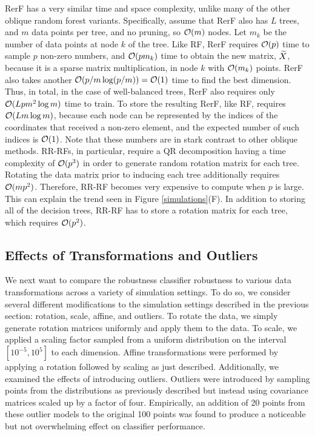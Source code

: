 \documentclass{article}
\begin{document}
RerF has a very similar time and space complexity, unlike many of the other oblique random forest variants.  Specifically, assume that RerF also has $L$ trees, and $m$ data points per tree, and no pruning, so $\mathcal{O}(m)$ nodes. Let $m_k$ be the number of data points at node $k$ of the tree. Like RF, RerF requires $\mathcal{O}(p)$ time to sample $p$ non-zero numbers, and $\mathcal{O}(pm_k)$ time to obtain the new matrix, $\widetilde{X}$, because it is a sparse matrix multiplication, in node $k$ with $\mathcal{O}(m_k)$ points. RerF also takes another $\mathcal{O}(p/m\log(p/m))=\mathcal{O}(1)$ time to find the best dimension. Thus, in total, in the case of well-balanced trees, RerF also requires only $\mathcal{O}(Lpm^2\log m)$ time to train.  To store the resulting RerF, like RF, requires $\mathcal{O}(L m\log m)$, because each node can be represented by the indices of the coordinates that received a non-zero element, and the expected number of such indices is $\mathcal{O}(1)$. Note that these numbers are in stark contrast to other oblique methods. RR-RFs, in particular, require a QR decomposition having a time complexity of $\mathcal{O}(p^3)$ in order to generate random rotation matrix for each tree. Rotating the data matrix prior to inducing each tree additionally requires $\mathcal{O}(mp^2)$. Therefore, RR-RF becomes very expensive to compute when $p$ is large. This can explain the trend seen in Figure \ref{simulations}(F). In addition to storing all of the decision trees, RR-RF has to store a rotation matrix for each tree, which requires $\mathcal{O}(p^2)$.

\subsection{Effects of Transformations and Outliers}
\label{section: trans}

We next want to compare the robustness classifier robustness to various data transformations across a variety of simulation settings. To do so, we consider several different modifications to the simulation settings described in the previous section: rotation, scale, affine, and outliers. To rotate the data, we simply generate rotation matrices uniformly and apply them to the data. To scale, we applied a scaling factor sampled from a uniform distribution on the interval $[10^{-5},10^5]$ to each dimension. Affine transformations were performed by applying a rotation followed by scaling as just described. Additionally, we examined the effects of introducing outliers. Outliers were introduced by sampling points from the distributions as previously described but instead using covariance matrices scaled up by a factor of four. Empirically, an addition of 20 points from these outlier models to the original 100 points was found to produce a noticeable but not overwhelming effect on classifier performance.
\end{document}
